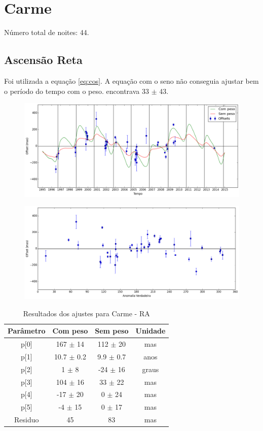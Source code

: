 \documentclass[11pt,a4paper]{report}
\begin{document}
\chapter*{Carme}

\indent \indent Número total de noites: 44.

\section*{Ascensão Reta}

Foi utilizada a equação \ref{eq:cos}. A equação com o seno não conseguia ajustar bem o período do tempo com o peso. encontrava 33 $\pm$ 43.

\begin{figure}[h]
\includegraphics[scale=0.45]{Carme/RA.png} 
\end{figure}

\begin{figure}[h]
\includegraphics[scale=0.45]{Carme/RA_anom.png}  
\end{figure}

\begin{table}[h!]
\caption{\label{Tab: Carme-RA} Resultados dos ajustes para Carme - RA}
\begin{centering}
\begin{tabular}{cccc}
\hline
\hline
Parâmetro & Com peso & Sem peso & Unidade\tabularnewline
\hline
p[0] & 167 $\pm$ 14 & 112 $\pm$ 20 & mas\\
p[1] & 10.7 $\pm$ 0.2 & 9.9 $\pm$ 0.7 & anos\\
p[2] & 1 $\pm$ 8 & -24 $\pm$ 16 & graus\\
p[3] & 104 $\pm$ 16 & 33 $\pm$ 22 & mas\\
p[4] & -17 $\pm$ 20 & 0 $\pm$ 24 & mas\\
p[5] & -4 $\pm$ 15 & 0 $\pm$ 17 & mas\\
Residuo & 45 & 83 & mas\\
\hline 
\end{tabular} 
\par\end{centering}
\end{table}
\end{document}
